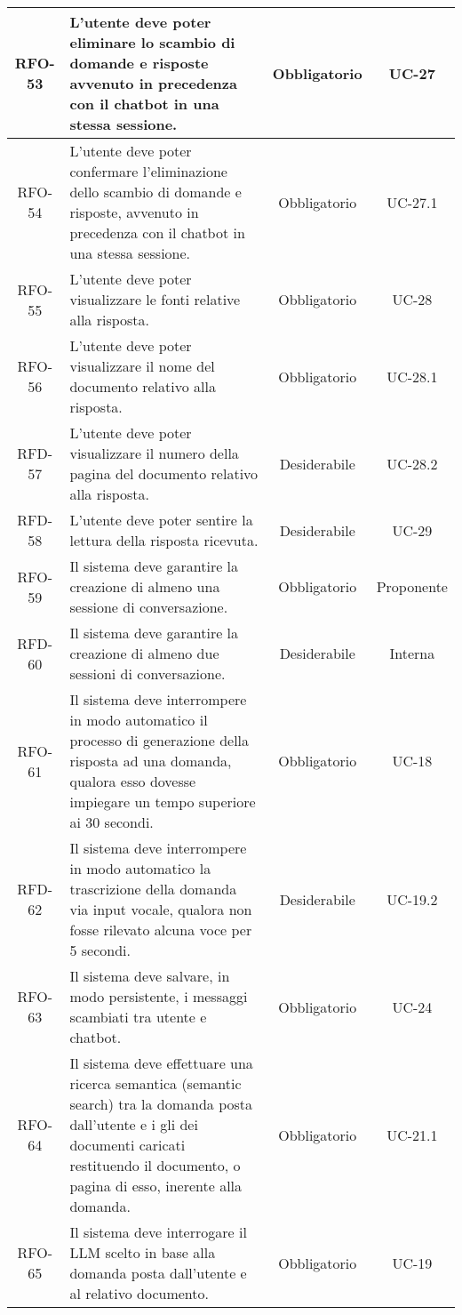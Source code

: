 \begin{xltabular}{\textwidth}{| c | X | c | c |}
    \hline
    RFO-53 & L’utente deve poter eliminare lo scambio di domande e risposte avvenuto in precedenza con il chatbot in una stessa sessione. & Obbligatorio & UC-27 \\
    \hline
    RFO-54 & L’utente deve poter confermare l'eliminazione dello scambio di domande e risposte, avvenuto in precedenza con il chatbot in una stessa sessione. & Obbligatorio & UC-27.1 \\
    \hline
    RFO-55 & L’utente deve poter visualizzare le fonti relative alla risposta. & Obbligatorio & UC-28 \\
    \hline
    RFO-56 & L’utente deve poter visualizzare il nome del documento relativo alla risposta. & Obbligatorio & UC-28.1 \\
    \hline
    RFD-57 & L'utente deve poter visualizzare il numero della pagina del documento relativo alla risposta. & Desiderabile & UC-28.2 \\
    \hline
    RFD-58 & L’utente deve poter sentire la lettura della risposta ricevuta. & Desiderabile & UC-29 \\
    \hline
    RFO-59 & Il sistema deve garantire la creazione di almeno una sessione di conversazione. & Obbligatorio & Proponente\\ %
    \hline
    RFD-60 & Il sistema deve garantire la creazione di almeno due sessioni di conversazione. & Desiderabile & Interna\\ %
    \hline
    RFO-61 & Il sistema deve interrompere in modo automatico il processo di generazione della risposta ad una domanda, qualora esso dovesse impiegare un tempo superiore ai 30 secondi. & Obbligatorio & UC-18\\
    \hline
    RFD-62 & Il sistema deve interrompere in modo automatico la trascrizione della domanda via input vocale, qualora non fosse rilevato alcuna voce per 5 secondi. & Desiderabile & UC-19.2\\
    \hline
    RFO-63 & Il sistema deve salvare, in modo persistente, i messaggi scambiati tra utente e chatbot. & Obbligatorio & UC-24\\
    \hline
    RFO-64 & Il sistema deve effettuare una ricerca semantica (semantic search) tra la domanda posta dall'utente e i gli  dei documenti caricati restituendo il documento, o pagina di esso, inerente alla domanda. & Obbligatorio & UC-21.1\\
    \hline
    RFO-65 & Il sistema deve interrogare il LLM scelto in base alla domanda posta dall'utente e al relativo documento. & Obbligatorio & UC-19\\

\end{xltabular}
